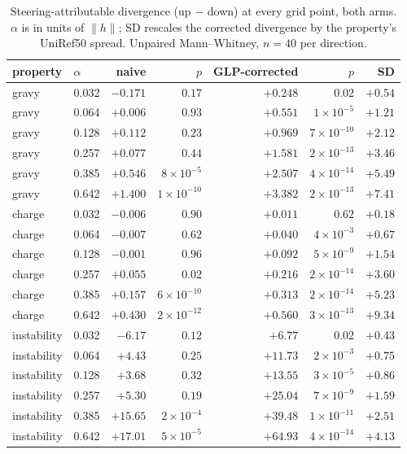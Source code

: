 \documentclass{article}
\begin{document}
\begin{table}[htbp]
\centering
\caption{Steering-attributable divergence (up $-$ down) at every grid point, both arms.
$\alpha$ is in units of $\lVert h\rVert$; SD rescales the corrected divergence by the
property's UniRef50 spread. Unpaired Mann--Whitney, $n{=}40$ per direction.}
\label{tab:steer-efficacy}
\begin{tabular}{llrrrrr}
\toprule
property & $\alpha$ & naive & $p$ & GLP-corrected & $p$ & SD \\
\midrule
gravy & 0.032 & $-0.171$ & $0.17$ & $+0.248$ & $0.02$ & $+0.54$ \\
gravy & 0.064 & $+0.006$ & $0.93$ & $+0.551$ & $1{\times}10^{-5}$ & $+1.21$ \\
gravy & 0.128 & $+0.112$ & $0.23$ & $+0.969$ & $7{\times}10^{-10}$ & $+2.12$ \\
gravy & 0.257 & $+0.077$ & $0.44$ & $+1.581$ & $2{\times}10^{-13}$ & $+3.46$ \\
gravy & 0.385 & $+0.546$ & $8{\times}10^{-5}$ & $+2.507$ & $4{\times}10^{-14}$ & $+5.49$ \\
gravy & 0.642 & $+1.400$ & $1{\times}10^{-10}$ & $+3.382$ & $2{\times}10^{-13}$ & $+7.41$ \\
\addlinespace
charge & 0.032 & $-0.006$ & $0.90$ & $+0.011$ & $0.62$ & $+0.18$ \\
charge & 0.064 & $-0.007$ & $0.62$ & $+0.040$ & $4{\times}10^{-3}$ & $+0.67$ \\
charge & 0.128 & $-0.001$ & $0.96$ & $+0.092$ & $5{\times}10^{-9}$ & $+1.54$ \\
charge & 0.257 & $+0.055$ & $0.02$ & $+0.216$ & $2{\times}10^{-14}$ & $+3.60$ \\
charge & 0.385 & $+0.157$ & $6{\times}10^{-10}$ & $+0.313$ & $2{\times}10^{-14}$ & $+5.23$ \\
charge & 0.642 & $+0.430$ & $2{\times}10^{-12}$ & $+0.560$ & $3{\times}10^{-13}$ & $+9.34$ \\
\addlinespace
instability & 0.032 & $-6.17$ & $0.12$ & $+6.77$ & $0.02$ & $+0.43$ \\
instability & 0.064 & $+4.43$ & $0.25$ & $+11.73$ & $2{\times}10^{-3}$ & $+0.75$ \\
instability & 0.128 & $+3.68$ & $0.32$ & $+13.55$ & $3{\times}10^{-5}$ & $+0.86$ \\
instability & 0.257 & $+5.30$ & $0.19$ & $+25.04$ & $7{\times}10^{-9}$ & $+1.59$ \\
instability & 0.385 & $+15.65$ & $2{\times}10^{-4}$ & $+39.48$ & $1{\times}10^{-11}$ & $+2.51$ \\
instability & 0.642 & $+17.01$ & $5{\times}10^{-5}$ & $+64.93$ & $4{\times}10^{-14}$ & $+4.13$ \\
\bottomrule
\end{tabular}
\end{table}
\end{document}
